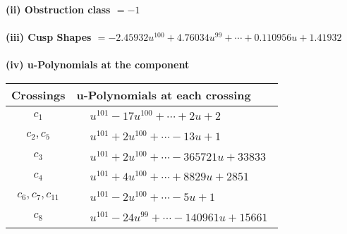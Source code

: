 \documentclass[1p]{elsarticle_modified}
\theoremstyle{definition}
\begin{document}
\flushleft \textbf{(ii) Obstruction class $= -1$}\\~\\
\flushleft \textbf{(iii) Cusp Shapes $= -2.45932 u^{100}+4.76034 u^{99}+\cdots+0.110956 u+1.41932$}\\~\\
\newpage\renewcommand{\arraystretch}{1}
\flushleft \textbf{(iv) u-Polynomials at the component}\newline \\
\begin{tabular}{m{50pt}|m{274pt}}
Crossings & \hspace{64pt}u-Polynomials at each crossing \\
\hline $$\begin{aligned}c_{1}\end{aligned}$$&$\begin{aligned}
&u^{101}-17 u^{100}+\cdots+2 u+2
\end{aligned}$\\
\hline $$\begin{aligned}c_{2},c_{5}\end{aligned}$$&$\begin{aligned}
&u^{101}+2 u^{100}+\cdots-13 u+1
\end{aligned}$\\
\hline $$\begin{aligned}c_{3}\end{aligned}$$&$\begin{aligned}
&u^{101}+2 u^{100}+\cdots-365721 u+33833
\end{aligned}$\\
\hline $$\begin{aligned}c_{4}\end{aligned}$$&$\begin{aligned}
&u^{101}+4 u^{100}+\cdots+8829 u+2851
\end{aligned}$\\
\hline $$\begin{aligned}c_{6},c_{7},c_{11}\end{aligned}$$&$\begin{aligned}
&u^{101}-2 u^{100}+\cdots-5 u+1
\end{aligned}$\\
\hline $$\begin{aligned}c_{8}\end{aligned}$$&$\begin{aligned}
&u^{101}-24 u^{99}+\cdots-140961 u+15661
\end{aligned}$\\

\end{tabular}
\end{document}
